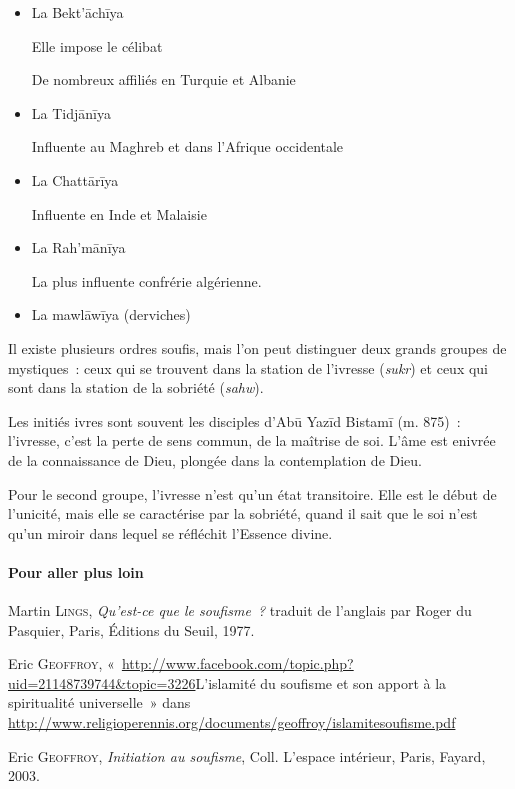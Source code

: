 \begin{itemize}
\item
  La Bekt'āchīya


Elle impose le célibat

De nombreux affiliés en Turquie et Albanie


\item
  La Tidjānīya


Influente au Maghreb et dans l'Afrique occidentale


\item
  La Chattārīya

Influente en Inde et Malaisie


\item
  La Rah'mānīya


La plus influente confrérie algérienne.


\item
  La mawlāwīya (derviches)
\end{itemize}

Il existe plusieurs ordres soufis, mais l'on peut distinguer deux grands
groupes de mystiques~: ceux qui se trouvent dans la station de l'ivresse
(\emph{sukr}) et ceux qui sont dans la station de la sobriété
(\emph{sahw}).

Les initiés ivres sont souvent les disciples d'Abū Yazīd Bistamī (m.
875)~: l'ivresse, c'est la perte de sens commun, de la maîtrise de soi.
L'âme est enivrée de la connaissance de Dieu, plongée dans la
contemplation de Dieu.

Pour le second groupe, l'ivresse n'est qu'un état transitoire. Elle est
le début de l'unicité, mais elle se caractérise par la sobriété, quand
il sait que le soi n'est qu'un miroir dans lequel se réfléchit l'Essence
divine.

\paragraph{Pour aller plus loin}

Martin \textsc{Lings}, \emph{Qu'est-ce que le soufisme~?} traduit de
l'anglais par Roger du Pasquier, Paris, Éditions du Seuil, 1977.

Eric \textsc{Geoffroy},
«~\url{http://www.facebook.com/topic.php?uid=21148739744\&topic=3226}{L'islamité
du soufisme et son apport à la spiritualité universelle}~» dans
\url{http://www.religioperennis.org/documents/geoffroy/islamitesoufisme.pdf}

Eric \textsc{Geoffroy}, \emph{Initiation au soufisme}, Coll. L'espace
intérieur, Paris, Fayard, 2003.

